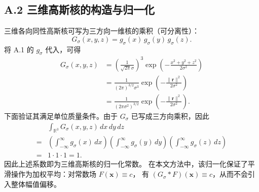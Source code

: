 \subsection*{A.2 三维高斯核的构造与归一化}
三维各向同性高斯核可写为三方向一维核的乘积（可分离性）：
\begin{equation}
G_\sigma(x,y,z)=g_\sigma(x)\,g_\sigma(y)\,g_\sigma(z).
\end{equation}
将 A.1 的 $g_\sigma$ 代入，可得
\begin{equation}
\begin{aligned}
G_\sigma(x,y,z)
&=\left(\frac{1}{\sqrt{2\pi}\sigma}\right)^3
\exp\!\left(-\frac{x^2+y^2+z^2}{2\sigma^2}\right) \\
&=\frac{1}{(2\pi)^{3/2}\sigma^3}
\exp\!\left(-\frac{\|\mathbf{r}\|^2}{2\sigma^2}\right)\\
&=\frac{1}{(2\pi\sigma^2)^{3/2}}
\exp\!\left(-\frac{\|\mathbf{r}\|^2}{2\sigma^2}\right).
\end{aligned}
\end{equation}
下面验证其满足单位质量条件。由于 $G_\sigma$ 已写成三方向乘积，因此
\begin{equation}
\begin{aligned}
&\int_{\mathbb{R}^3}G_\sigma(x,y,z)\,dx\,dy\,dz\\
=&\left(\int_{-\infty}^{\infty}g_\sigma(x)\,dx\right)
  \left(\int_{-\infty}^{\infty}g_\sigma(y)\,dy\right)
  \left(\int_{-\infty}^{\infty}g_\sigma(z)\,dz\right) \\
=&1\cdot 1\cdot 1 = 1.
\end{aligned}
\end{equation}
因此上述系数即为三维高斯核的归一化常数。
在本文方法中，该归一化保证了平滑操作为加权平均：对常数场 $F(\mathbf{x})\equiv c$，
有 $(G_\sigma*F)(\mathbf{x})\equiv c$，从而不会引入整体幅值偏移。